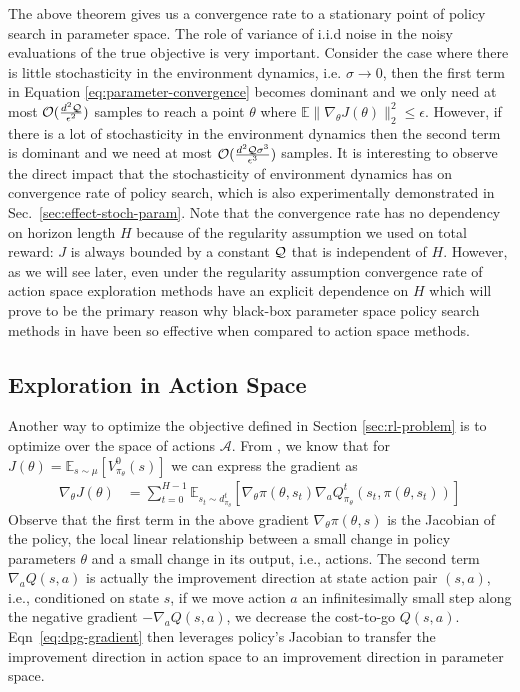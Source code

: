 The above theorem gives us a convergence rate to a stationary point of
policy search in parameter space. The role of variance of i.i.d noise
in the noisy evaluations of the true objective is very
important. Consider the case where there is little stochasticity in
the environment dynamics, i.e. $\sigma \rightarrow 0$, then the first term in
Equation \ref{eq:parameter-convergence} becomes dominant and we only
need at most $\mathcal{O}(\frac{d^2\mathcal{Q}}{\epsilon^2})$ samples to reach a point $\theta$
where $\mathbb{E}\|\nabla_\theta J(\theta)\|_2^2 \leq
\epsilon$. However, if there is a lot of stochasticity in the
environment dynamics then the second term is dominant and we need at most
$\mathcal{O}(\frac{d^2\mathcal{Q}\sigma^3}{\epsilon^3})$ samples. It is
interesting to observe the direct impact that the stochasticity of
environment dynamics has on convergence rate of policy search, which
is also experimentally demonstrated in
Sec.~\ref{sec:effect-stoch-param}. Note that the convergence rate has
no dependency on horizon length $H$ because of the regularity
assumption we used on total reward: $J$ is always bounded by a
constant $\mathcal{Q}$ that is independent of $H$. However, as we will see
later, even under the regularity assumption convergence rate of action
space exploration methods have an explicit dependence on $H$
which will prove to be the primary
reason why black-box parameter space policy search methods in \citep{mania2018simple} have been so effective when compared to action space methods.


\subsection{Exploration in Action Space}
\label{sec:action_space}

Another way to optimize the objective defined in Section \ref{sec:rl-problem}
is to optimize over the space of actions $\mathcal{A}$. From \citep{silver2014deterministic}, we know that for
$J(\theta) = \mathbb{E}_{s \sim \mu}[V^0_{\pi_\theta}(s)]$ we can express the
gradient as
\begin{align}
  \label{eq:dpg-gradient}
  \nabla_\theta J(\theta) &= \sum_{t=0}^{H-1} \mathbb{E}_{s_t \sim
    d^t_{\pi_\theta}} \left[\nabla_\theta \pi(\theta, s_t) \nabla_a
  Q^t_{\pi_\theta}(s_t, \pi(\theta, s_t))\right]
\end{align}
Observe that the first term in the above gradient $\nabla_\theta
\pi(\theta, s)$ is the Jacobian of the policy, the local linear relationship
between  a small change in policy parameters $\theta$ and a small change in its output, i.e., actions. The second term $\nabla_{a}Q(s,a)$ is actually the improvement direction at state action pair $(s,a)$, i.e., conditioned on state $s$, if we move action $a$ an infinitesimally small step along the negative gradient $-\nabla_{a}Q(s,a)$, we decrease the cost-to-go $Q(s,a)$. Eqn~\ref{eq:dpg-gradient} then leverages policy's Jacobian to transfer the improvement direction in action space to an improvement direction in parameter space.  

